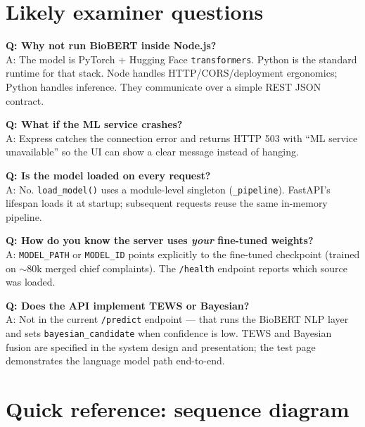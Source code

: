 \documentclass[11pt]{article}
\begin{document}
\section{Likely examiner questions}

\begin{qabox}
\textbf{Q: Why not run BioBERT inside Node.js?}\\
A: The model is PyTorch + Hugging Face \texttt{transformers}. Python is the standard runtime for
that stack. Node handles HTTP/CORS/deployment ergonomics; Python handles inference. They communicate
over a simple REST JSON contract.

\medskip
\textbf{Q: What if the ML service crashes?}\\
A: Express catches the connection error and returns HTTP 503 with ``ML service unavailable'' so the
UI can show a clear message instead of hanging.

\medskip
\textbf{Q: Is the model loaded on every request?}\\
A: No. \texttt{load\_model()} uses a module-level singleton (\texttt{\_pipeline}). FastAPI's
lifespan loads it at startup; subsequent requests reuse the same in-memory pipeline.

\medskip
\textbf{Q: How do you know the server uses \emph{your} fine-tuned weights?}\\
A: \texttt{MODEL\_PATH} or \texttt{MODEL\_ID} points explicitly to the fine-tuned checkpoint
(trained on $\sim$80k merged chief complaints). The \texttt{/health} endpoint reports which source
was loaded.

\medskip
\textbf{Q: Does the API implement TEWS or Bayesian?}\\
A: Not in the current \texttt{/predict} endpoint --- that runs the BioBERT NLP layer and sets
\texttt{bayesian\_candidate} when confidence is low. TEWS and Bayesian fusion are specified in the
system design and presentation; the test page demonstrates the language model path end-to-end.
\end{qabox}

\section{Quick reference: sequence diagram}
\end{document}
